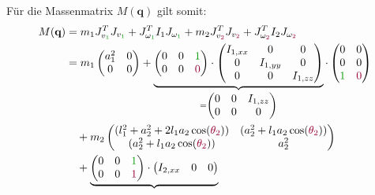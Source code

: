\documentclass[a4paper, 12pt]{scrartcl}
\newcommand{\gruen}[2][gruen]{\textcolor{#1}{#2}}
\newcommand{\dunkelrot}[2][dunkelrot]{\textcolor{#1}{#2}}
\begin{document}
Für die Massenmatrix $M(\textbf{q})$ gilt somit:
\begin{align*}
    M(\textbf{q}) 
    &= m_1 J_{v_{\gruen{1}}}^T J_{v_{\gruen{1}}} 
    + J_{\omega_{\gruen{1}}}^T I_1 J_{\omega_{\gruen{1}}}  
    + m_2 J_{v_{\dunkelrot{2}}}^T J_{v_{\dunkelrot{2}}} 
    + J_{\omega_{\dunkelrot{2}}}^T I_2 J_{\omega_{\dunkelrot{2}}}    
    \\
    &=
    m_1 
    \begin{pmatrix}
        a_1^2 & 0 \\
        0 & 0
    \end{pmatrix}
    +
    \underbrace{
        \begin{pmatrix}
            0 & 0 & \gruen{1} \\
            0 & 0 & \dunkelrot{0}
        \end{pmatrix}
        \cdot
        \begin{pmatrix}
            I_{1,xx} & 0 & 0 \\
            0 & I_{1,yy} & 0 \\
            0 & 0 & I_{1,zz}
        \end{pmatrix}}_{
        = 
        \begin{pmatrix}
            0 & 0 & I_{1,zz} \\
            0 & 0 & 0
        \end{pmatrix}
    }
    \cdot   
    \begin{pmatrix}
        0 & 0 \\
        0 & 0 \\
        \gruen{1} & \dunkelrot{0}
    \end{pmatrix}
    \\
    &\quad +
    m_2
    \begin{pmatrix}
        (l_1^2 + a_2^2 + 2 l_1 a_2  \cos(\dunkelrot{\theta_{2}})) 
        & (a_2^2 + l_1 a_2  \cos(\dunkelrot{\theta_{2}})) \\
        (a_2^2 + l_1 a_2  \cos(\dunkelrot{\theta_{2}})) 
        & a_2^2
    \end{pmatrix}
    \\
    &\quad +
    \underbrace{
        \begin{pmatrix}
            0 & 0 & \gruen{1} \\
            0 & 0 & \dunkelrot{1}
        \end{pmatrix}
        \cdot
        \begin{pmatrix}
            I_{2,xx} & 0 & 0 \\

\end{pmatrix}}
\end{align*}
\end{document}
